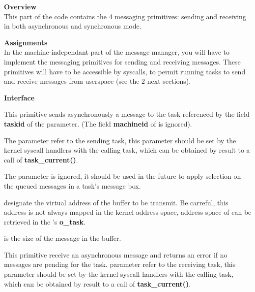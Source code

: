 \begin{itemize}
  \item {\bf Overview}\\

    This part of the code contains the 4 messaging primitives: sending
    and receiving in both asynchronous and synchronous mode.

  \item {\bf Assignments}\\

    In the machine-independant part of the message manager, you will
    have to implement the messaging primitives for sending and
    receiving messages.  These primitives will have to be accessible
    by syscalls, to permit running tasks to send and receive messages
    from userspace (see the 2 next sections).

  \item {\bf Interface}\\

	 {
	   \item This primitive sends asynchronously a message to the task
	   referenced by the field \textbf{taskid} of the 
	   parameter. (The field \textbf{machineid} of 
	   is ignored).

	   \item The  parameter refer to the sending task, this
	   parameter should be set by the kernel syscall handlers with the
	   calling task, which can be obtained by result to a call of
	   \textbf{task\_current()}.

	   \item The  parameter is ignored, it should be used in the
	   future to apply selection on the queued messages in a task's
	   message box.

	   \item {} designate the virtual address of the buffer to be
	   transmit. Be carreful, this address is not always mapped in the
	   kernel address space, address space of  can be
	   retrieved in the 's \textbf{o\_task}.

	   \item {} is the size of the message in the
	    buffer.
	 }

	 {
	   \item This primitive receive an asynchronous message and returns
	   an error if no messages are pending for the 
	   task.  parameter refer to the receiving task,
	   this parameter should be set by the kernel syscall handlers with the
	   calling task, which can be obtained by result to a call of
	   \textbf{task\_current()}.

}
\end{itemize}

